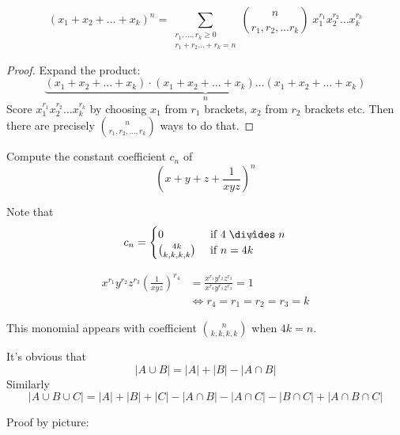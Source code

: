 \documentclass[10pt]{scrartcl}
\begin{document}
\begin{theorem}
\[(x_1 + x_2 + \dots + x_k)^n = \sum_{\substack{r_1,\dots,r_k\geq 0\\r_1+r_2\dots+r_k = n}} \binom{n}{r_1,r_2,\dots r_k}\;x_1^{r_1}x_2^{r_2}\dots x_k^{r_k}\]
\end{theorem}

\begin{proof}
Expand the product:
\[\underbrace{(x_1+x_2+\dots+x_k)\cdot(x_1+x_2+\dots + x_k) \dots (x_1 + x_2 + \dots + x_k)}_{n}\]
Score $x_1^{r_1}x_2^{r_2}\dots x_k^{r_k}$ by choosing $x_1$ from $r_1$ brackets, $x_2$ from $r_2$ brackets etc. Then there are precisely $\binom{n}{r_1,r_2,\dots,r_k}$ ways to do that. 
\end{proof}

\begin{example}
Compute the constant coefficient $c_n$ of 
\[\left(x + y + z + \frac{1}{xyz}\right)^n\]	

Note that 
\[c_n = \begin{cases}
 0 & \text{ if } 4 \centernot\divides n\\
 \binom{4k}{k,k,k,k} &\text{ if } n = 4k	
 \end{cases}
\]

\[
\begin{aligned}
  x^{r_1}y^{r_2}z^{r_3} \left(\frac{1}{xyz}\right)^{r_4} &= \frac{  x^{r_1}y^{r_2}z^{r_3} }{x^{r_4}y^{r_4}z^{r_4}} = 1\\
  &\iff r_4 = r_1 = r_2 = r_3 = k
\end{aligned}
\]

This monomial appears with coefficient $\binom{n}{k,k,k,k}$ when $4k =n $. 
\end{example}


It's obvious that  
\[|A \cup B| = |A| + |B| -|A\cap B|\]
Similarly 
\[|A\cup B\cup C| = |A| + |B| + |C| - |A\cap B| - |A\cap C| - |B\cap C| + |A\cap B\cap C|\]

Proof by picture: 
\begin{center}
  \def\firstcircle{(90:1.75cm) circle (2.5cm)}
  \def\secondcircle{(210:1.75cm) circle (2.5cm)}
  \def\thirdcircle{(330:1.75cm) circle (2.5cm)}
\end{center}
\end{document}
